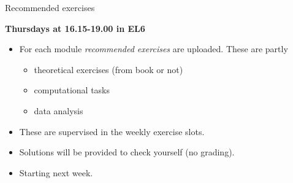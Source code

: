 \documentclass[
  10pt,
  ignorenonframetext,
]{beamer}
\providecommand{\tightlist}{%
  \setlength{\itemsep}{0pt}\setlength{\parskip}{0pt}}
\begin{document}
\begin{frame}
\begin{block}{Recommended exercises}
\protect\hypertarget{recommended-exercises}{}
\vspace{4mm}

\textbf{Thursdays at 16.15-19.00 in EL6}

\vspace{4mm}

\begin{itemize}
\tightlist
\item
  For each module \emph{recommended exercises} are uploaded. These are
  partly

  \begin{itemize}
  \tightlist
  \item
    theoretical exercises (from book or not)
  \item
    computational tasks
  \item
    data analysis
  \end{itemize}
\end{itemize}

\vspace{2mm}

\begin{itemize}
\tightlist
\item
  These are supervised in the weekly exercise slots.
\end{itemize}

\vspace{2mm}

\begin{itemize}
\tightlist
\item
  Solutions will be provided to check yourself (no grading).
\end{itemize}

\vspace{2mm}

\begin{itemize}
\tightlist
\item
  Starting next week.
\end{itemize}

\(~\)
\end{block}
\end{frame}
\end{document}
